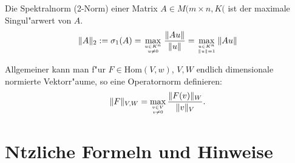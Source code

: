 \documentclass[11pt, a4paper]{article}
\begin{document}
\begin{definition}
Die Spektralnorm (2-Norm) einer Matrix $A \in M(m \times n, K($ ist der maximale Singul"arwert von $A$.
$$
\|A\|_{2}:=\sigma_{1}(A)=\max _{u \in K^n \atop u \neq 0} \frac{\|A u\|}{\|u\|}=\max _{u \in K^n \atop \|u\|=1}\|A u\|
$$
\end{definition}

\begin{remark}
Allgemeiner kann man f"ur $F \in \mathrm{Hom}(V, w)$, $V, W$ endlich dimensionale normierte Vektorr"aume, so eine Operatornorm definieren:
$$
\|F\|_{V, W} = \max\limits_{ v \in V \atop v \neq 0} \frac{\|F(v)\|_W}{\|v\|_V}.
$$
\end{remark}



\section{N\uee tzliche Formeln und Hinweise}
\end{document}
